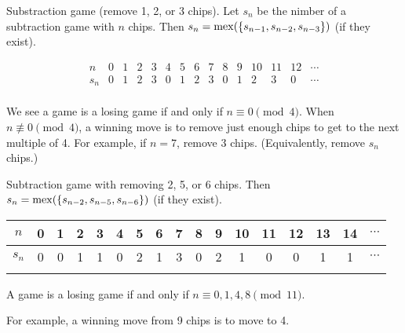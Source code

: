 \documentclass[12pt,letterpaper]{report}
\begin{document}
\begin{ex}
  Substraction game (remove 1, 2, or 3 chips).
  Let $s_n$ be the nimber of a subtraction game with $n$ chips.
  Then $s_n = \operatorname*{mex}(\{s_{n - 1}, s_{n - 2}, s_{n - 3}\})$ (if they exist).

  \[
    \begin{array}{c|c|c|c|c|c|c|c|c|c|c|c|c|c|c}
      n & 0 & 1 & 2 & 3 & 4 & 5 & 6 & 7 & 8 & 9 & 10 & 11 & 12 & \cdots \\
      \hline
      s_n & 0 & 1 & 2 & 3 & 0 & 1 & 2 & 3 & 0 & 1 & 2 & 3 & 0 & \cdots \\
    \end{array}
  \]

  We see a game is a losing game if and only if $n \equiv 0 \pmod{4}$.
  When $n \not\equiv 0 \pmod{4}$, a winning move is to remove just enough chips to get to the next
  multiple of 4.
  For example, if $n = 7$, remove 3 chips.
  (Equivalently, remove $s_n$ chips.)
\end{ex}

\begin{ex}
  Subtraction game with removing 2, 5, or 6 chips.
  Then $s_n = \operatorname*{mex}(\{s_{n - 2}, s_{n - 5}, s_{n - 6}\})$ (if they exist).

  \begin{center}
    \begin{tabular}{c|c|c|c|c|c|c|c|c|c|c|c|c|c|c|c|c}
      $n$ & 0 & 1 & 2 & 3 & 4 & 5 & 6 & 7 & 8 & 9 & 10 & 11 & 12 & 13 & 14 & $\cdots$ \\
      \hline
      $s_n$ & 0 & 0 & 1 & 1 & 0 & 2 & 1 & 3 & 0 & 2 & 1 & 0 & 0 & 1 & 1 & $\cdots$ \\
      \multicolumn{1}{c}{} & \multicolumn{11}{c}{
        \raisebox{0.5\normalbaselineskip}{
          \clap{
            $\underbrace{
              \hphantom{\mbox{{0}{1}{2}{3}{4}{5}{6}{7}{8}{9}{10}\hspace*{
                \dimexpr25\arraycolsep+10\arrayrulewidth
              }}}
            }_{\text{repeats (not proved here)}}$
          }
        }
      } & \multicolumn{5}{c}{} \\
    \end{tabular}
  \end{center}

  A game is a losing game if and only if $n \equiv 0, 1, 4, 8 \pmod{11}$.

  For example, a winning move from 9 chips is to move to 4.
\end{ex}
\end{document}
